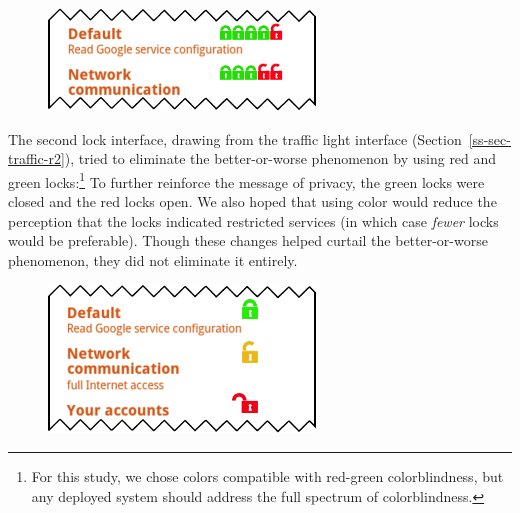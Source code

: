 \documentclass[11pt]{article}
\newcommand{\refsec}[1]{Section~\ref{#1}}
\begin{document}
\begin{figure}
\begin{center}
\includegraphics[width=.9\linewidth]{candidate-img/locks/locksR2.png}
\end{center}
\end{figure}

The second lock interface, drawing from the traffic light interface
(\refsec{ss-sec-traffic-r2}), tried to eliminate the better-or-worse 
phenomenon by using red and green locks:\footnote{For this 
  study, we chose colors
  compatible with red-green colorblindness, but any deployed system
  should address the full spectrum of colorblindness.}
\label{ss-sec-locks-r2}
To further reinforce the message of privacy, the 
green locks were closed and the red locks open.
We also hoped that using color would reduce 
the perception that the locks indicated restricted services (in which 
case \emph{fewer} locks would be preferable).
Though these changes helped curtail the better-or-worse phenomenon, they did not 
eliminate it entirely. 


\begin{figure}
\begin{center}
\includegraphics[width=.9\linewidth]{candidate-img/locks/locksR3.png}
\end{center}
\end{figure}
\end{document}
